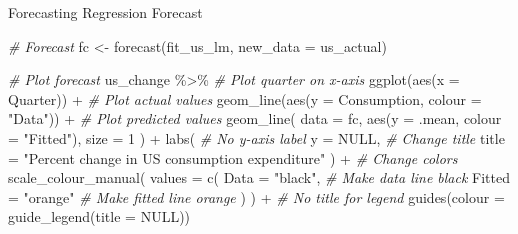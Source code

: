 \documentclass[
  ignorenonframetext,
]{beamer}
\newenvironment{Shaded}{\begin{snugshade}}{\end{snugshade}}
\newcommand{\AttributeTok}[1]{\textcolor[rgb]{0.77,0.63,0.00}{#1}}
\newcommand{\CommentTok}[1]{\textcolor[rgb]{0.56,0.35,0.01}{\textit{#1}}}
\newcommand{\ConstantTok}[1]{\textcolor[rgb]{0.00,0.00,0.00}{#1}}
\newcommand{\DecValTok}[1]{\textcolor[rgb]{0.00,0.00,0.81}{#1}}
\newcommand{\FunctionTok}[1]{\textcolor[rgb]{0.00,0.00,0.00}{#1}}
\newcommand{\NormalTok}[1]{#1}
\newcommand{\OtherTok}[1]{\textcolor[rgb]{0.56,0.35,0.01}{#1}}
\newcommand{\SpecialCharTok}[1]{\textcolor[rgb]{0.00,0.00,0.00}{#1}}
\newcommand{\StringTok}[1]{\textcolor[rgb]{0.31,0.60,0.02}{#1}}
\begin{document}
\begin{frame}[fragile]{Forecasting \textbar{} \small Regression
Forecast}
\protect\hypertarget{forecasting-regression-forecast}{}
\tiny

\begin{Shaded}
\begin{Highlighting}[]
\CommentTok{\# Forecast}
\NormalTok{fc }\OtherTok{\textless{}{-}} \FunctionTok{forecast}\NormalTok{(fit\_us\_lm, }\AttributeTok{new\_data =}\NormalTok{ us\_actual)}

\CommentTok{\# Plot forecast}
\NormalTok{us\_change }\SpecialCharTok{\%\textgreater{}\%}
  \CommentTok{\# Plot quarter on x{-}axis}
  \FunctionTok{ggplot}\NormalTok{(}\FunctionTok{aes}\NormalTok{(}\AttributeTok{x =}\NormalTok{ Quarter)) }\SpecialCharTok{+}
  \CommentTok{\# Plot actual values}
  \FunctionTok{geom\_line}\NormalTok{(}\FunctionTok{aes}\NormalTok{(}\AttributeTok{y =}\NormalTok{ Consumption, }\AttributeTok{colour =} \StringTok{"Data"}\NormalTok{)) }\SpecialCharTok{+}
  \CommentTok{\# Plot predicted values}
  \FunctionTok{geom\_line}\NormalTok{(}
    \AttributeTok{data =}\NormalTok{ fc,}
    \FunctionTok{aes}\NormalTok{(}\AttributeTok{y =}\NormalTok{ .mean, }\AttributeTok{colour =} \StringTok{"Fitted"}\NormalTok{),}
    \AttributeTok{size =} \DecValTok{1}
\NormalTok{  ) }\SpecialCharTok{+}
  \FunctionTok{labs}\NormalTok{(}
    \CommentTok{\# No y{-}axis label}
    \AttributeTok{y =} \ConstantTok{NULL}\NormalTok{, }
    \CommentTok{\# Change title}
    \AttributeTok{title =} \StringTok{"Percent change in US consumption expenditure"}
\NormalTok{  ) }\SpecialCharTok{+}
  \CommentTok{\# Change colors}
  \FunctionTok{scale\_colour\_manual}\NormalTok{(}
    \AttributeTok{values =} \FunctionTok{c}\NormalTok{(}
      \AttributeTok{Data =} \StringTok{"black"}\NormalTok{, }\CommentTok{\# Make data line black}
      \AttributeTok{Fitted =} \StringTok{"orange"} \CommentTok{\# Make fitted line orange}
\NormalTok{    )}
\NormalTok{  ) }\SpecialCharTok{+}
  \CommentTok{\# No title for legend}
  \FunctionTok{guides}\NormalTok{(}\AttributeTok{colour =} \FunctionTok{guide\_legend}\NormalTok{(}\AttributeTok{title =} \ConstantTok{NULL}\NormalTok{))}
\end{Highlighting}
\end{Shaded}

\normalfont
\end{frame}
\end{document}
